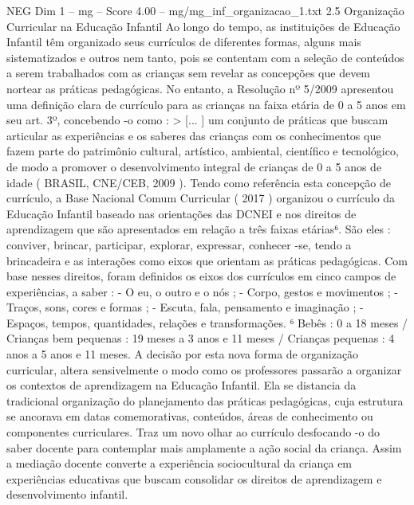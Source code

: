 \begin{textsample}{NEG Dim 1 – mg – Score 4.00 – mg/mg\_inf\_organizacao\_1.txt}  \label{ex:f1_neg_057}
2.5 Organização Curricular na Educação Infantil Ao longo do tempo, as instituições de Educação Infantil têm organizado seus currículos de diferentes formas, alguns mais sistematizados e outros nem tanto, pois se contentam com a seleção de conteúdos a serem trabalhados com as crianças sem revelar as concepções que devem nortear as práticas pedagógicas.
No entanto, a Resolução nº 5/2009 apresentou uma definição clara de currículo para as crianças na faixa etária de 0 a 5 anos em seu art. 3º, concebendo -o como : > [... ] um conjunto de práticas que buscam articular as experiências e os saberes das crianças com os conhecimentos que fazem parte do patrimônio cultural, artístico, ambiental, científico e tecnológico, de modo a promover o desenvolvimento integral de crianças de 0 a 5 anos de idade ( BRASIL, CNE/CEB, 2009 ).
Tendo como referência esta concepção de currículo, a Base Nacional Comum Curricular ( 2017 ) organizou o currículo da Educação Infantil baseado nas orientações das DCNEI e nos direitos de aprendizagem que são apresentados em relação a três faixas etárias⁶.
São eles : conviver, brincar, participar, explorar, expressar, conhecer -se, tendo a brincadeira e as interações como eixos que orientam as práticas pedagógicas.
Com base nesses direitos, foram definidos os eixos dos currículos em cinco campos de experiências, a saber : - O eu, o outro e o nós ; - Corpo, gestos e movimentos ; - Traços, sons, cores e formas ; - Escuta, fala, pensamento e imaginação ; - Espaços, tempos, quantidades, relações e transformações. ⁶ Bebês : 0 a 18 meses / Crianças bem pequenas : 19 meses a 3 anos e 11 meses / Crianças pequenas : 4 anos a 5 anos e 11 meses.
A decisão por esta nova forma de organização curricular, altera sensivelmente o modo como os professores passarão a organizar os contextos de aprendizagem na Educação Infantil.
Ela se distancia da tradicional organização do planejamento das práticas pedagógicas, cuja estrutura se ancorava em datas comemorativas, conteúdos, áreas de conhecimento ou componentes curriculares.
Traz um novo olhar ao currículo desfocando -o do saber docente para contemplar mais amplamente a ação social da criança.
Assim a mediação docente converte a experiência sociocultural da criança em experiências educativas que buscam consolidar os direitos de aprendizagem e desenvolvimento infantil.

\end{textsample}
